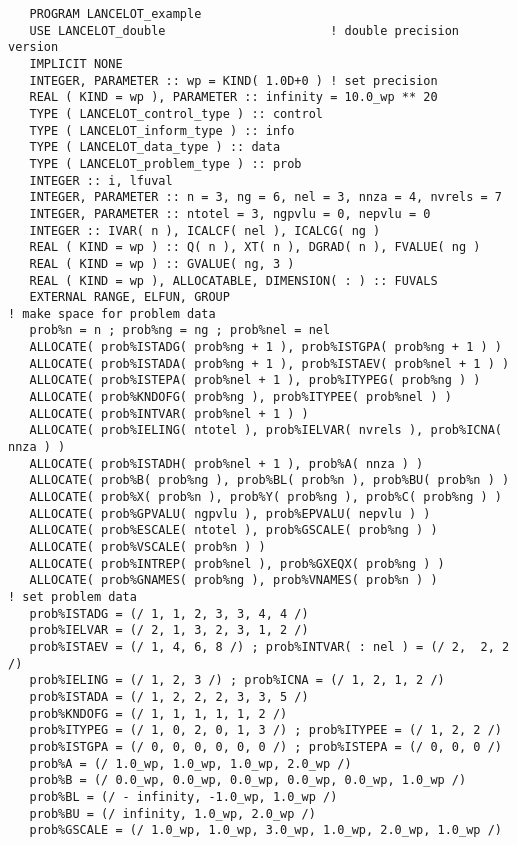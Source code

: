\documentclass{galahad}
\begin{document}
\def\baselinestretch{0.8}
{%
{\tt \begin{verbatim}
   PROGRAM LANCELOT_example
   USE LANCELOT_double                       ! double precision version
   IMPLICIT NONE
   INTEGER, PARAMETER :: wp = KIND( 1.0D+0 ) ! set precision
   REAL ( KIND = wp ), PARAMETER :: infinity = 10.0_wp ** 20
   TYPE ( LANCELOT_control_type ) :: control
   TYPE ( LANCELOT_inform_type ) :: info
   TYPE ( LANCELOT_data_type ) :: data
   TYPE ( LANCELOT_problem_type ) :: prob
   INTEGER :: i, lfuval
   INTEGER, PARAMETER :: n = 3, ng = 6, nel = 3, nnza = 4, nvrels = 7
   INTEGER, PARAMETER :: ntotel = 3, ngpvlu = 0, nepvlu = 0
   INTEGER :: IVAR( n ), ICALCF( nel ), ICALCG( ng )
   REAL ( KIND = wp ) :: Q( n ), XT( n ), DGRAD( n ), FVALUE( ng )
   REAL ( KIND = wp ) :: GVALUE( ng, 3 )
   REAL ( KIND = wp ), ALLOCATABLE, DIMENSION( : ) :: FUVALS
   EXTERNAL RANGE, ELFUN, GROUP
! make space for problem data
   prob%n = n ; prob%ng = ng ; prob%nel = nel
   ALLOCATE( prob%ISTADG( prob%ng + 1 ), prob%ISTGPA( prob%ng + 1 ) )
   ALLOCATE( prob%ISTADA( prob%ng + 1 ), prob%ISTAEV( prob%nel + 1 ) )
   ALLOCATE( prob%ISTEPA( prob%nel + 1 ), prob%ITYPEG( prob%ng ) )
   ALLOCATE( prob%KNDOFG( prob%ng ), prob%ITYPEE( prob%nel ) )
   ALLOCATE( prob%INTVAR( prob%nel + 1 ) )
   ALLOCATE( prob%IELING( ntotel ), prob%IELVAR( nvrels ), prob%ICNA( nnza ) )
   ALLOCATE( prob%ISTADH( prob%nel + 1 ), prob%A( nnza ) )
   ALLOCATE( prob%B( prob%ng ), prob%BL( prob%n ), prob%BU( prob%n ) )
   ALLOCATE( prob%X( prob%n ), prob%Y( prob%ng ), prob%C( prob%ng ) )
   ALLOCATE( prob%GPVALU( ngpvlu ), prob%EPVALU( nepvlu ) )
   ALLOCATE( prob%ESCALE( ntotel ), prob%GSCALE( prob%ng ) )
   ALLOCATE( prob%VSCALE( prob%n ) )
   ALLOCATE( prob%INTREP( prob%nel ), prob%GXEQX( prob%ng ) )
   ALLOCATE( prob%GNAMES( prob%ng ), prob%VNAMES( prob%n ) )
! set problem data
   prob%ISTADG = (/ 1, 1, 2, 3, 3, 4, 4 /)
   prob%IELVAR = (/ 2, 1, 3, 2, 3, 1, 2 /)
   prob%ISTAEV = (/ 1, 4, 6, 8 /) ; prob%INTVAR( : nel ) = (/ 2,  2, 2 /)
   prob%IELING = (/ 1, 2, 3 /) ; prob%ICNA = (/ 1, 2, 1, 2 /)
   prob%ISTADA = (/ 1, 2, 2, 2, 3, 3, 5 /)
   prob%KNDOFG = (/ 1, 1, 1, 1, 1, 2 /)
   prob%ITYPEG = (/ 1, 0, 2, 0, 1, 3 /) ; prob%ITYPEE = (/ 1, 2, 2 /)
   prob%ISTGPA = (/ 0, 0, 0, 0, 0, 0 /) ; prob%ISTEPA = (/ 0, 0, 0 /)
   prob%A = (/ 1.0_wp, 1.0_wp, 1.0_wp, 2.0_wp /)
   prob%B = (/ 0.0_wp, 0.0_wp, 0.0_wp, 0.0_wp, 0.0_wp, 1.0_wp /)
   prob%BL = (/ - infinity, -1.0_wp, 1.0_wp /)
   prob%BU = (/ infinity, 1.0_wp, 2.0_wp /)
   prob%GSCALE = (/ 1.0_wp, 1.0_wp, 3.0_wp, 1.0_wp, 2.0_wp, 1.0_wp /)

\end{verbatim}}}
\end{document}
